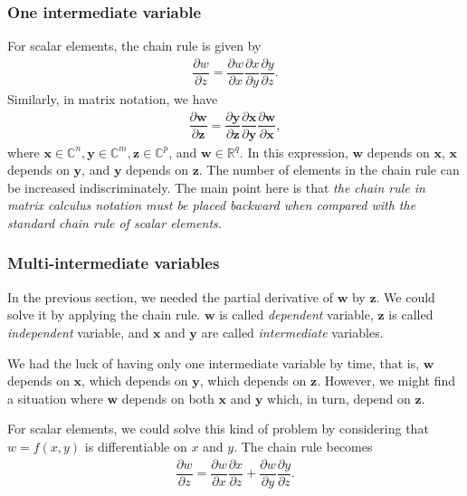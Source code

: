 \documentclass{article}
\begin{document}
\subsubsection{One intermediate variable}
For scalar elements, the chain rule is given by
\begin{align}
    \dfrac{\partial w}{\partial z} = \dfrac{\partial w}{\partial x} \dfrac{\partial x}{\partial y} \dfrac{\partial y}{\partial z}.
\end{align}
Similarly, in matrix notation, we have
\begin{align}
    \label{eq:chain-1inter}
    \dfrac{\partial \mathbf{w}}{\partial \mathbf{z}} = \dfrac{\partial \mathbf{y}}{\partial \mathbf{z}} \dfrac{\partial \mathbf{x}}{\partial \mathbf{y}} \dfrac{\partial \mathbf{w}}{\partial \mathbf{x}},
\end{align}
where \(\mathbf{x} \in \mathbb{C}^{n}, \mathbf{y} \in \mathbb{C}^{m}, \mathbf{z} \in \mathbb{C}^{p}\), and \(\mathbf{w} \in \mathbb{R}^q\). In this expression, \(\mathbf{w}\) depends on \(\mathbf{x}\), \(\mathbf{x}\) depends on \(\mathbf{y}\), and \(\mathbf{y}\) depends on \(\mathbf{z}\). The number of elements in the chain rule can be increased indiscriminately. The main point here is that \emph{the chain rule in matrix calculus notation must be placed backward when compared with the standard chain rule of scalar elements}.

\subsubsection{Multi-intermediate variables}

In the previous section, we needed the partial derivative of \(\mathbf{w}\) by \(\mathbf{z}\). We could solve it by applying the chain rule. \(\mathbf{w}\) is called \emph{dependent} variable, \(\mathbf{z}\) is called \emph{independent} variable, and \(\mathbf{x}\) and \(\mathbf{y}\) are called \emph{intermediate} variables.

We had the luck of having only one intermediate variable by time, that is, \(\mathbf{w}\) depends on \(\mathbf{x}\), which depends on \(\mathbf{y}\), which depends on \(\mathbf{z}\). However, we might find a situation where \(\mathbf{w}\) depends on both \(\mathbf{x}\) and \(\mathbf{y}\) which, in turn, depend on \(\mathbf{z}\).

For scalar elements, we could solve this kind of problem by considering that \(w = f(x, y)\) is differentiable on \(x\) and \(y\). The chain rule becomes
\begin{align}
    \dfrac{\partial w}{\partial z} = \dfrac{\partial w}{\partial x} \dfrac{\partial x}{\partial z} + \dfrac{\partial w}{\partial y} \dfrac{\partial y}{\partial z}.
\end{align}
\end{document}
